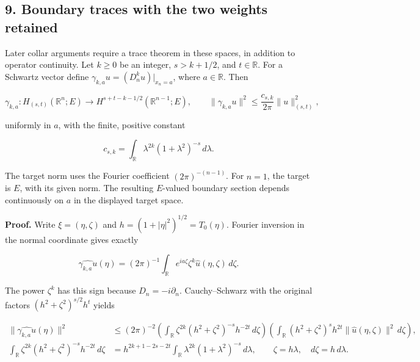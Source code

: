 \documentclass[
  11pt,
]{article}
\makeatletter
\let\ReaderOriginalAnchorStart\hyper@anchorstart
\let\ReaderOriginalAnchorEnd\hyper@anchorend
\let\ReaderPendingAliases\@empty
\def\ReaderArmAliases#1{\gdef\ReaderPendingAliases{#1}}
\def\hyper@anchorstart#1{\ReaderIfNativeAnchorTF{#1}{\ReaderPendingAliases\global\let\ReaderPendingAliases\@empty}{}\ReaderOriginalAnchorStart{#1}}
\makeatother
\begin{document}
\ReaderArmAliases{\ReaderOriginalAnchorStart{AN03-MSB-009}\ReaderOriginalAnchorEnd\begingroup\expandafter\def\csname @currentHref\endcsname{AN03-MSB-009}\label{AN03-MSB-009}\endgroup}
\subsection{9. Boundary traces with the two weights
retained}\label{boundary-traces-with-the-two-weights-retained}

Later collar arguments require a trace theorem in these spaces, in
addition to operator continuity. Let \(k\geq0\) be an integer,
\(s>k+1/2\), and \(t\in\mathbb R\). For a Schwartz vector define
\(\gamma_{k,a}u=(D_n^ku)|_{x_n=a}\), where \(a\in\mathbb R\). Then

\[
 \gamma_{k,a}:H_{(s,t)}(\mathbb R^n;E)
       \longrightarrow H^{s+t-k-1/2}(\mathbb R^{n-1};E),
 \qquad
 \|\gamma_{k,a}u\|^2
       \leq \frac{c_{s,k}}{2\pi}\|u\|_{(s,t)}^2,
 \tag{MSB44}
\]

uniformly in \(a\), with the finite, positive constant

\[
 c_{s,k}=\int_{\mathbb R}\lambda^{2k}(1+\lambda^2)^{-s}\,d\lambda.
 \tag{MSB45}
\]

The target norm uses the Fourier coefficient \((2\pi)^{-(n-1)}\). For
\(n=1\), the target is \(E\), with its given norm. The resulting
\(E\)-valued boundary section depends continuously on \(a\) in the
displayed target space.

\textbf{Proof.} Write \(\xi=(\eta,\zeta)\) and
\(h=(1+|\eta|^2)^{1/2}=T_0(\eta)\). Fourier inversion in the normal
coordinate gives exactly

\[
 \widehat{\gamma_{k,a}u}(\eta)
   =(2\pi)^{-1}\int_{\mathbb R}
          e^{ia\zeta}\zeta^k\widehat u(\eta,\zeta)\,d\zeta.
 \tag{MSB46}
\]

The power \(\zeta^k\) has this sign because \(D_n=-i\partial_n\).
Cauchy--Schwarz with the original factors \((h^2+\zeta^2)^{s/2}h^t\)
yields

\[
 \begin{aligned}
 \|\widehat{\gamma_{k,a}u}(\eta)\|^2
 &\leq (2\pi)^{-2}
   \left(\int_{\mathbb R}
      \zeta^{2k}(h^2+\zeta^2)^{-s}h^{-2t}\,d\zeta\right)
   \left(\int_{\mathbb R}
      (h^2+\zeta^2)^sh^{2t}
          \|\widehat u(\eta,\zeta)\|^2\,d\zeta\right),\\
 \int_{\mathbb R}\zeta^{2k}(h^2+\zeta^2)^{-s}h^{-2t}\,d\zeta
 &=h^{2k+1-2s-2t}
   \int_{\mathbb R}\lambda^{2k}(1+\lambda^2)^{-s}\,d\lambda,
 \qquad \zeta=h\lambda,\quad d\zeta=h\,d\lambda.
 \end{aligned}
 \tag{MSB47}
\]
\end{document}
